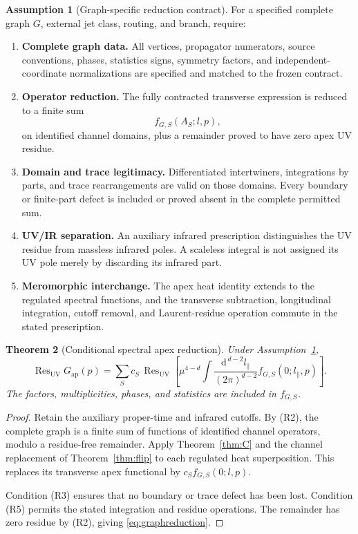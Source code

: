 \documentclass[11pt,a4paper]{article}
\newcommand{\dd}{\mathrm d}
\newcommand{\ResUV}{\operatorname{Res}_{\mathrm{UV}}}
\theoremstyle{plain}
\newtheorem{theorem}{Theorem}[section]
\theoremstyle{definition}
\newtheorem{assumption}[theorem]{Assumption}
\theoremstyle{remark}
\numberwithin{equation}{section}
\begin{document}
\begin{assumption}[Graph-specific reduction contract]
\label{ass:reduction}
For a specified complete graph \(G\), external jet class,
routing, and branch, require:
\begin{enumerate}[label=\textup{(R\arabic*)}]
\item \textbf{Complete graph data.}
All vertices, propagator numerators, source conventions, phases,
statistics signs, symmetry factors, and independent-coordinate
normalizations are specified and matched to the frozen contract.

\item \textbf{Operator reduction.}
The fully contracted transverse expression is reduced to a finite
sum
\[
 f_{G,S}(A_S;l,p),
\]
on identified channel domains, plus a remainder proved to have
zero apex UV residue.

\item \textbf{Domain and trace legitimacy.}
Differentiated intertwiners, integrations by parts, and trace
rearrangements are valid on those domains.
Every boundary or finite-part defect is included or proved absent
in the complete permitted sum.

\item \textbf{UV/IR separation.}
An auxiliary infrared prescription distinguishes the UV residue
from massless infrared poles. A scaleless integral is not assigned
its UV pole merely by discarding its infrared part.

\item \textbf{Meromorphic interchange.}
The apex heat identity extends to the regulated spectral
functions, and the transverse subtraction, longitudinal
integration, cutoff removal, and Laurent-residue operation
commute in the stated prescription.
\end{enumerate}
\end{assumption}

\begin{theorem}[Conditional spectral apex reduction]
\label{thm:reduction}
Under Assumption~\ref{ass:reduction},
\begin{equation}
 \ResUV G_{\mathrm{ap}}(p)
 =
 \sum_S c_S\,
 \ResUV\left[
 \mu^{4-d}\int
 \frac{\dd^{\,d-2}l_\parallel}{(2\pi)^{d-2}}
 f_{G,S}(0;l_\parallel,p)\right].
 \label{eq:graphreduction}
\end{equation}
The factors, multiplicities, phases, and statistics are included
in \(f_{G,S}\).
\end{theorem}

\begin{proof}
Retain the auxiliary proper-time and infrared cutoffs.
By (R2), the complete graph is a finite sum of functions of
identified channel operators, modulo a residue-free remainder.
Apply Theorem~\ref{thm:C} and the channel replacement of
Theorem~\ref{thm:flip} to each regulated heat superposition.
This replaces its transverse apex functional by
\(c_S f_{G,S}(0;l,p)\).

Condition (R3) ensures that no boundary or trace defect has been
lost. Condition (R5) permits the stated integration and residue
operations. The remainder has zero residue by (R2), giving
\eqref{eq:graphreduction}.
\end{proof}
\end{document}
